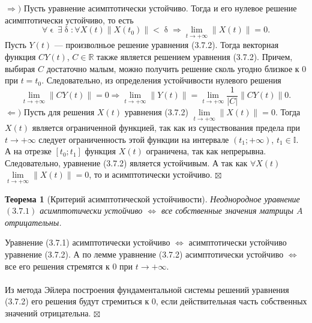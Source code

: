 \documentclass[a4paper, 12pt]{report}
\newenvironment{Proof} %
{\par\noindent{$\blacklozenge$}} %
{\hfill$\scriptstyle\boxtimes$}
\newcommand{\Rm}{\mathbb{R}}
\newcommand{\I}{\mathbb{I}}
\renewcommand{\delta}{\updelta}
\renewcommand{\epsilon}{\upvarepsilon}
\newcommand\Norm[1]{\left\| #1 \right\|}
\newtheorem*{theorem}{Теорема}
\begin{document}
\begin{Proof}
	$\Rightarrow)$ Пусть уравнение асимптотически устойчиво. Тогда и его нулевое решение асимптотически устойчиво, то есть $$\forall \epsilon\ \exists \delta : \forall X(t) \Norm{X(t_0)} < \delta \Rightarrow \lim\limits_{t\to +\infty} \Norm{X(t)} = 0.$$
	Пусть $Y(t)$ --- произволньое решение уравнения (3.7.2). Тогда векторная функция $CY(t)$, $C \in \Rm$ также является решением уравнения (3.7.2). Причем, выбирая $C$ достаточно малым, можно получить решение сколь угодно близкое к 0 при $t = t_0$. Следовательно, из определения устойчивости нулевого решения $$\lim\limits_{t\to +\infty} \Norm{CY(t)} = 0 \Rightarrow \lim\limits_{t\to +\infty} \Norm{Y(t)} = \lim\limits_{t\to +\infty} \dfrac{1}{|C|}\Norm{CY(t)} 0 .$$
	$\Leftarrow)$ Пусть для решения $X(t)$ уравнения (3.7.2) $\lim\limits_{t\to +\infty} \Norm{X(t)} = 0$. Тогда $X(t)$ является ограниченной функцией, так как из существования предела при $t\to +\infty$ следует ограниченность этой функции на интервале $(t_1; +\infty)$, $t_1 \in \I$. А на отрезке $[t_0; t_1]$ функция $X(t)$ ограничена, так как непрерывна. Следовательно, уравнение (3.7.2) является устойчивым. А так как $\forall X(t)$ $\lim\limits_{t\to +\infty} \Norm{X(t)} = 0$, то и асимптотически устойчиво.
\end{Proof}
\begin{theorem}
	[Критерий асимптотической устойчивости]
	Неоднородное уравнение $(3.7.1)$ асимптотически устойчиво $\Longleftrightarrow$ все собственные значения матрицы $A$ отрицательны.
\end{theorem}
\begin{Proof}
	Уравнение (3.7.1) асимптотически устойчиво $\Longleftrightarrow$ асимптотически устойчиво уравнение (3.7.2). А по лемме уравнение (3.7.2) асимптотически устойчиво $\Longleftrightarrow$ все его решения стремятся к 0 при $t\to+\infty$.\\\\
	Из метода Эйлера построения фундаментальной системы решений уравнения (3.7.2) его решения будут стремиться к 0, если действительная часть собственных значений отрицательна.
\end{Proof}
\end{document}

